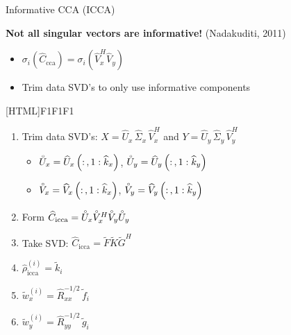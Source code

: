 \documentclass[8pt]{beamer}
\newcommand{\Vxhat}{\widehat{V}_x}
\newcommand{\Vyhat}{\widehat{V}_y}
\newcommand{\Uxcir}{\accentset{\circ}{U}_x}
\newcommand{\Uycir}{\accentset{\circ}{U}_y}
\newcommand{\Vxcir}{\accentset{\circ}{V}_x}
\newcommand{\Vycir}{\accentset{\circ}{V}_y}
\newcommand{\Cccahat}{\widehat{C}_{\text{cca}}}
\newcommand{\Ciccahat}{\widehat{C}_{\text{icca}}}
\begin{document}
\begin{frame}{Informative CCA (ICCA)}


  \textbf{Not all singular vectors are informative!} (Nadakuditi, 2011)
  \begin{itemize}
  \item $\sigma_i\left(\Cccahat\right) = \sigma_i\left(\Vxhat^H\Vyhat\right)$
  \item Trim data SVD's to only use informative components
  \end{itemize}

  \vspace{2ex}

  [HTML]{F1F1F1}{\parbox{0.9\textwidth}{%
  \begin{enumerate}
    \itemsep=1ex
  \item Trim data SVD's: $X=\widehat{U}_x\,\widehat{\Sigma}_x\,\widehat{V}_x^H$ and $Y=\widehat{U}_y\,\widehat{\Sigma}_y\, \widehat{V}_y^H$
    \begin{itemize}
    \item $\Uxcir = \widehat{U}_x\left(:\,,1:\widehat{k}_x\right)$, $\Uycir = \widehat{U}_y\left(:\,,1:\widehat{k}_y\right)$
    \item $\Vxcir = \widehat{V}_x\left(:\,,1:\widehat{k}_x\right)$, $\Vycir = \widehat{V}_y\left(:\,,1:\widehat{k}_y\right)$
    \end{itemize}

  \item Form
    $\Ciccahat=\Uxcir\Vxcir^H\Vycir\Uycir$
  \item Take SVD: $\Ciccahat = \widetilde{F}\widetilde{K}\widetilde{G}^H$
  \item $\widehat{\rho}_{\text{icca}}^{(i)} = \widetilde{k}_i$
  \item $\widetilde{w}_x^{(i)}=\widehat{R}_{xx}^{-1/2}\,\widetilde{f}_i$
  \item $\widetilde{w}_y^{(i)}=\widehat{R}_{yy}^{-1/2}\,\widetilde{g}_i$
  \end{enumerate}}}

\end{frame}
\end{document}
